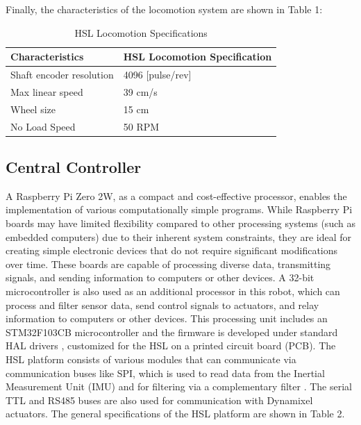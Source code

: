 \documentclass[conference]{IEEEtran}
\begin{document}
Finally, the characteristics of the locomotion system are shown in Table 1:
\begin{table}[htbp]
\centering
\caption{HSL Locomotion Specifications}
\begin{tabular}{|l|l|}
\hline
\textbf{Characteristics}   & \textbf{HSL Locomotion Specification} \\ \hline
Shaft encoder resolution   & 4096 [pulse/rev]                      \\ \hline
Max linear speed           & 39 cm/s                               \\ \hline
Wheel size                 & 15 cm                                 \\ \hline
No Load Speed              & 50 RPM                                \\ \hline
\end{tabular}
\label{tab:hsl_locomotion}
\end{table}

\subsection{Central Controller}
A Raspberry Pi Zero 2W, as a compact and cost-effective processor, enables the implementation of various computationally simple programs. While Raspberry Pi boards may have limited flexibility compared to other processing systems (such as embedded computers) due to their inherent system constraints, they are ideal for creating simple electronic devices that do not require significant modifications over time. These boards are capable of processing diverse data, transmitting signals, and sending information to computers or other devices. A 32-bit microcontroller is also used as an additional processor in this robot, which can process and filter sensor data, send control signals to actuators, and relay information to computers or other devices. This processing unit includes an STM32F103CB microcontroller and the firmware is developed under standard HAL drivers \cite{STM32_ReferenceManual}, customized for the HSL on a printed circuit board (PCB). The HSL platform consists of various modules that can communicate via communication buses like SPI, which is used to read data from the Inertial Measurement Unit (IMU) and for filtering via a complementary filter \cite{allgeuer2014robust}. The serial TTL and RS485 buses are also used for communication with Dynamixel actuators. The general specifications of the HSL platform are shown in Table 2.
\end{document}
